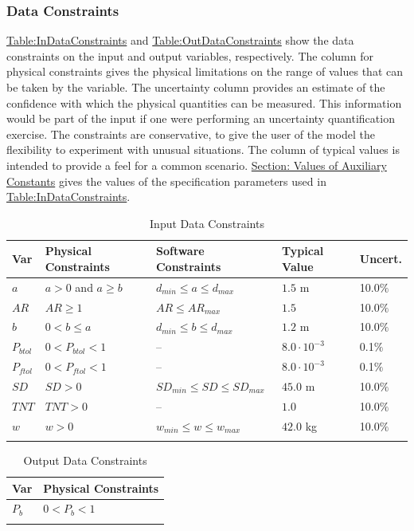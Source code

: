 \documentclass[12pt]{article}
\begin{document}
\subsubsection{Data Constraints}
\label{Sec:DataConstraints}
\hyperref[Table:InDataConstraints]{Table:InDataConstraints} and \hyperref[Table:OutDataConstraints]{Table:OutDataConstraints} show the data constraints on the input and output variables, respectively. The column for physical constraints gives the physical limitations on the range of values that can be taken by the variable. The uncertainty column provides an estimate of the confidence with which the physical quantities can be measured. This information would be part of the input if one were performing an uncertainty quantification exercise. The constraints are conservative, to give the user of the model the flexibility to experiment with unusual situations. The column of typical values is intended to provide a feel for a common scenario. \hyperref[Sec:AuxConstants]{Section: Values of Auxiliary Constants} gives the values of the specification parameters used in \hyperref[Table:InDataConstraints]{Table:InDataConstraints}.
\begin{longtable}{l l l l l}
\toprule
Var & Physical Constraints & Software Constraints & Typical Value & Uncert.
\\
\midrule
\endhead
$a$ & $a>0$ and $a\geq{}b$ & ${d_{min}}\leq{}a\leq{}{d_{max}}$ & $1.5$ m & 10.0$\%$
\\
$AR$ & $AR\geq{}1$ & $AR\leq{}{AR_{max}}$ & $1.5$ & 10.0$\%$
\\
$b$ & $0<b\leq{}a$ & ${d_{min}}\leq{}b\leq{}{d_{max}}$ & $1.2$ m & 10.0$\%$
\\
${P_{btol}}$ & $0<{P_{btol}}<1$ & -- & $8.0\cdot{}10^{-3}$ & 0.1$\%$
\\
${P_{ftol}}$ & $0<{P_{ftol}}<1$ & -- & $8.0\cdot{}10^{-3}$ & 0.1$\%$
\\
$SD$ & $SD>0$ & ${SD_{min}}\leq{}SD\leq{}{SD_{max}}$ & $45.0$ m & 10.0$\%$
\\
$TNT$ & $TNT>0$ & -- & $1.0$ & 10.0$\%$
\\
$w$ & $w>0$ & ${w_{min}}\leq{}w\leq{}{w_{max}}$ & $42.0$ kg & 10.0$\%$
\\
\bottomrule
\caption{Input Data Constraints}
\label{Table:InDataConstraints}
\end{longtable}
\begin{longtable}{l l}
\toprule
Var & Physical Constraints
\\
\midrule
\endhead
${P_{b}}$ & $0<{P_{b}}<1$
\\
\bottomrule
\caption{Output Data Constraints}
\label{Table:OutDataConstraints}
\end{longtable}
\end{document}
